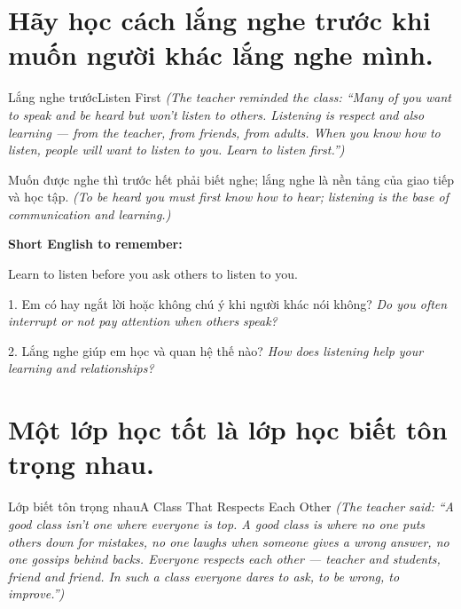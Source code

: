 \section{Hãy học cách lắng nghe trước khi muốn người khác lắng nghe mình.}
\begin{truyen}{Lắng nghe trước}{Listen First}
\textit{(The teacher reminded the class: ``Many of you want to speak and be heard but won't listen to others. Listening is respect and also learning — from the teacher, from friends, from adults. When you know how to listen, people will want to listen to you. Learn to listen first.'')}
\end{truyen}

\begin{baihoc}
Muốn được nghe thì trước hết phải biết nghe; lắng nghe là nền tảng của giao tiếp và học tập.
\textit{(To be heard you must first know how to hear; listening is the base of communication and learning.)}
\end{baihoc}

\begin{ghinhoanh}
\textbf{Short English to remember:}

Learn to listen before you ask others to listen to you.

\end{ghinhoanh}

\begin{tuhocnhanh}
1. Em có hay ngắt lời hoặc không chú ý khi người khác nói không? \textit{Do you often interrupt or not pay attention when others speak?}

2. Lắng nghe giúp em học và quan hệ thế nào? \textit{How does listening help your learning and relationships?}
\end{tuhocnhanh}
\ngancach

\section{Một lớp học tốt là lớp học biết tôn trọng nhau.}
\begin{truyen}{Lớp biết tôn trọng nhau}{A Class That Respects Each Other}
\textit{(The teacher said: ``A good class isn't one where everyone is top. A good class is where no one puts others down for mistakes, no one laughs when someone gives a wrong answer, no one gossips behind backs. Everyone respects each other — teacher and students, friend and friend. In such a class everyone dares to ask, to be wrong, to improve.'')}
\end{truyen}

